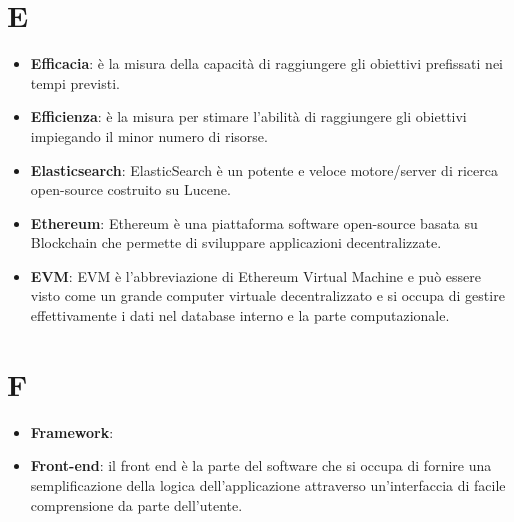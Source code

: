 \documentclass[a4paper, oneside, openany, dvipsnames, table]{article}
\begin{document}
\section{E}
\begin{itemize}
\item \textbf{Efficacia}: è la misura della capacità di raggiungere gli obiettivi prefissati nei tempi previsti.
\item \textbf{Efficienza}: è la misura per stimare l'abilità di raggiungere gli obiettivi impiegando il minor numero di risorse.
\item \textbf{Elasticsearch}: ElasticSearch è un potente e veloce motore/server di ricerca open-source costruito su Lucene.
\item \textbf{Ethereum}: Ethereum è una piattaforma software open-source basata su Blockchain che permette di sviluppare applicazioni decentralizzate.
\item \textbf{EVM}: EVM è l'abbreviazione di Ethereum Virtual Machine e può essere visto come un grande computer virtuale decentralizzato e si occupa di gestire effettivamente i dati nel database interno e la parte computazionale.
\end{itemize}

\section{F}
\begin{itemize}
\item \textbf{Framework}:
\item \textbf{Front-end}: il front end è la parte del software che si occupa di fornire una semplificazione della logica dell'applicazione attraverso un'interfaccia di facile comprensione da parte dell'utente.
\end{itemize}
\end{document}
